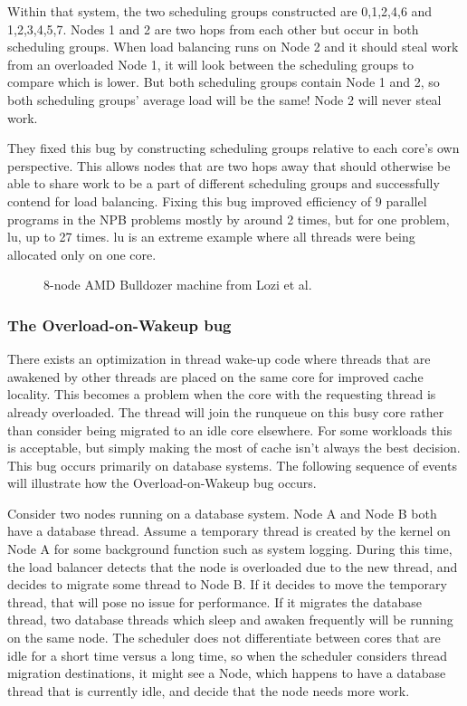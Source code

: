 \documentclass{sig-alternate}
\begin{document}
Within that system, the two scheduling groups constructed are {0,1,2,4,6} and {1,2,3,4,5,7}. Nodes 1 and 2 are two hops from each other but occur in both scheduling groups. When load balancing runs on Node 2 and it should steal work from an overloaded Node 1, it will look between the scheduling groups to compare which is lower. But both scheduling groups contain Node 1 and 2, so both scheduling groups' average load will be the same! Node 2 will never steal work.~\cite{Lozi:2016}

They fixed this bug by constructing scheduling groups relative to each core's own perspective. This allows nodes that are two hops away that should otherwise be able to share work to be a part of different scheduling groups and successfully contend for load balancing. Fixing this bug improved efficiency of 9 parallel programs in the NPB problems mostly by around 2 times, but for one problem, lu, up to 27 times. lu is an extreme example where all threads were being allocated only on one core.~\cite{Lozi:2016}

\begin{figure}
\centering
{}
\caption{8-node AMD Bulldozer machine from Lozi et al.~\cite{Lozi:2016}}
\label{fig:cfs_schedgroups}
\end{figure}

\subsubsection{The Overload-on-Wakeup bug}
\label{sec:cfsfault_overload}


There exists an optimization in thread wake-up code where threads that are awakened by other threads are placed on the same core for improved cache locality. This becomes a problem when the core with the requesting thread is already overloaded. The thread will join the runqueue on this busy core rather than consider being migrated to an idle core elsewhere. For some workloads this is acceptable, but simply making the most of cache isn't always the best decision. This bug occurs primarily on database systems. The following sequence of events will illustrate how the Overload-on-Wakeup bug occurs.~\cite{Lozi:2016}

Consider two nodes running on a database system. Node A and Node B both have a database thread. Assume a temporary thread is created by the kernel on Node A for some background function such as system logging. During this time, the load balancer detects that the node is overloaded due to the new thread, and decides to migrate some thread to Node B. If it decides to move the temporary thread, that will pose no issue for performance. If it migrates the database thread, two database threads which sleep and awaken frequently will be running on the same node. The scheduler does not differentiate between cores that are idle for a short time versus a long time, so when the scheduler considers thread migration destinations, it might see a Node, which happens to have a database thread that is currently idle, and decide that the node needs more work.~\cite{Lozi:2016}
\end{document}
